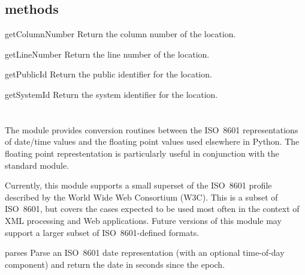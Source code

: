 \documentclass{howto}
\begin{document}
\subsection{ methods}

\begin{methoddesc}{getColumnNumber}{}
Return the column number of the location.
\end{methoddesc}

\begin{methoddesc}{getLineNumber}{}
Return the line number of the location.
\end{methoddesc}

\begin{methoddesc}{getPublicId}{}
Return the public identifier for the location.
\end{methoddesc}

\begin{methoddesc}{getSystemId}{}
Return the system identifier for the location.
\end{methoddesc}

\section{
         }



The  module provides conversion routines
between the ISO~8601 representations of date/time values and the
floating point values used elsewhere in Python.  The floating point
represtentation is particularly useful in conjunction with the
standard  module.

Currently, this module supports a small superset of the ISO~8601
profile described by the World Wide Web Consortium (W3C).  This is a
subset of ISO~8601, but covers the cases expected to be used most
often in the context of XML processing and Web applications.  Future
versions of this module may support a larger subset of
ISO~8601-defined formats.


\begin{funcdesc}{parse}{s}
Parse an ISO~8601 date representation (with an optional time-of-day
component) and return the date in seconds since the epoch.
\end{funcdesc}
\end{document}
